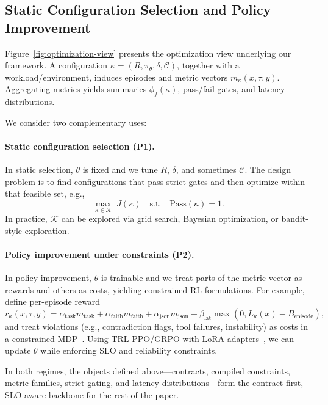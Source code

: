 \subsection{Static Configuration Selection and Policy Improvement}
\label{sec:problem-optimization}

Figure~\ref{fig:optimization-view} presents the optimization view underlying our framework.
A configuration $\kappa=(R,\pi_\theta,\delta,\mathcal{C})$, together with a workload/environment, induces episodes and metric vectors $m_\kappa(x,\tau,y)$.
Aggregating metrics yields summaries $\phi_f(\kappa)$, pass/fail gates, and latency distributions.

We consider two complementary uses:

\paragraph{Static configuration selection (P1).}
In static selection, $\theta$ is fixed and we tune $R$, $\delta$, and sometimes $\mathcal{C}$.
The design problem is to find configurations that pass strict gates and then optimize within that feasible set, e.g.,
\[
\max_{\kappa\in\mathcal{K}} \; J(\kappa)
\quad\text{s.t.}\quad \mathrm{Pass}(\kappa)=1.
\]
In practice, $\mathcal{K}$ can be explored via grid search, Bayesian optimization, or bandit-style exploration.

\paragraph{Policy improvement under constraints (P2).}
In policy improvement, $\theta$ is trainable and we treat parts of the metric vector as rewards and others as costs, yielding constrained RL formulations.
For example, define per-episode reward
\[
r_\kappa(x,\tau,y)=
\alpha_{\text{task}} m_{\text{task}}+
\alpha_{\text{faith}} m_{\text{faith}}+
\alpha_{\text{json}} m_{\text{json}}
-\beta_{\text{lat}}\max(0, L_\kappa(x)-B_{\text{episode}}),
\]
and treat violations (e.g., contradiction flags, tool failures, instability) as costs in a constrained MDP~\citep{altman1999cmdp,achiam2017cpo}.
Using TRL PPO/GRPO with LoRA adapters~\citep{schulman2017ppo,grpo,dettmers2023qlora}, we can update $\theta$ while enforcing SLO and reliability constraints.

In both regimes, the objects defined above---contracts, compiled constraints, metric families, strict gating, and latency distributions---form the contract-first, SLO-aware backbone for the rest of the paper.

